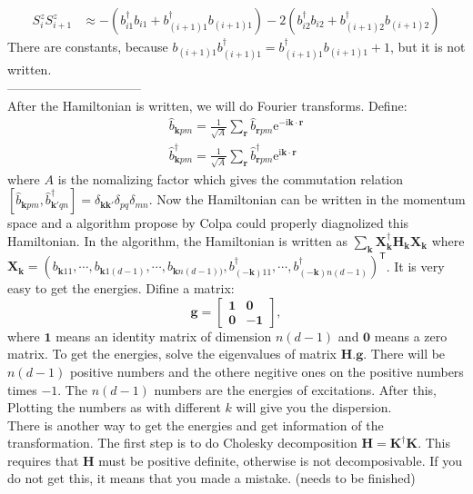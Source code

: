 \documentclass[letter]{article}
\newcommand{\e}{\mathrm{e}}
\newcommand{\ii}{\mathrm{i}}
\begin{document}
$$
\begin{aligned}
    S_{i}^z S_{i+1}^z &\approx-\left(b_{i1}^{\dagger}b_{i1}+b_{(i+1)1}^{\dagger}b_{(i+1)1}\right)-2\left(b_{i2}^{\dagger}b_{i2}+b_{(i+1)2}^{\dagger}b_{(i+1)2}\right)
\end{aligned}
$$
There are constants, because $b_{(i+1)1}b_{(i+1)1}^{\dagger}=b_{(i+1)1}^{\dagger}b_{(i+1)1}+1$, but it is not written. \\
--------------------------------\\
After the Hamiltonian is written, we will do Fourier transforms. Define:
$$ \begin{aligned}
    \hat{b}_{\bm{k}pm}=\frac{1}{\sqrt{A}}\sum_{\bm{r}}\hat{b}_{\bm{r}pm}\e^{-\ii\bm{k}\cdot\bm{r}} \\
    \hat{b}_{\bm{k}pm}^{\dagger}=\frac{1}{\sqrt{A}}\sum_{\bm{r}}\hat{b}_{\bm{r}pm}^{\dagger}\e^{\ii\bm{k}\cdot\bm{r}}
    \end{aligned} $$
where $A$ is the nomalizing factor which gives the commutation relation $\left[\hat{b}_{\bm{k}pm},\hat{b}_{\bm{k'}qn}^{\dagger}\right]=\delta_{\bm{k}\bm{k}'}\delta_{pq}\delta_{mn}$. Now the Hamiltonian can be written in the momentum space and a algorithm propose by Colpa could properly diagnolized this Hamiltonian. In the algorithm, the Hamiltonian is written as $\sum_{\bm{k}}\mathbf{X}^{\dagger}_{\bm{k}}\mathbf{H}_{\bm{k}}\mathbf{X}_{\bm{k}}$ where $\mathbf{X}_{\bm{k}}=\left(b_{\bm{k}11},\cdots,b_{\bm{k}1(d-1)},\cdots,b_{\bm{k}n(d-1))},b_{(-\bm{k})11}^{\dagger},\cdots,b_{(-\bm{k})n(d-1)}^{\dagger}\right)^{\mathsf{T}}$. It is very easy to get the energies. Difine a matrix:$$
\mathbf{g}=\begin{bmatrix}
    \mathbf{1} & \mathbf{0}  \\
    \mathbf{0} &  -\mathbf{1}
    \end{bmatrix},
$$
where $\mathbf{1}$ means an identity matrix of dimension $n(d-1)$ and $\mathbf{0}$ means a zero matrix. To get the energies, solve the eigenvalues of matrix $\mathbf{H}.\mathbf{g}$. There will be $n(d-1)$ positive numbers and the othere negitive ones on the positive numbers times $-1$. The $n(d-1)$ numbers are the energies of excitations. After this, Plotting the numbers as with different $k$ will give you the dispersion. \\
There is another way to get the energies and get information of the transformation. The first step is to do Cholesky decomposition $\mathbf{H}=\mathbf{K}^{\dagger}\mathbf{K}$. This requires that $\mathbf{H}$ must be positive definite, otherwise is not decomposivable. If you do not get this, it means that you made a mistake. (needs to be finished) \\
\end{document}
